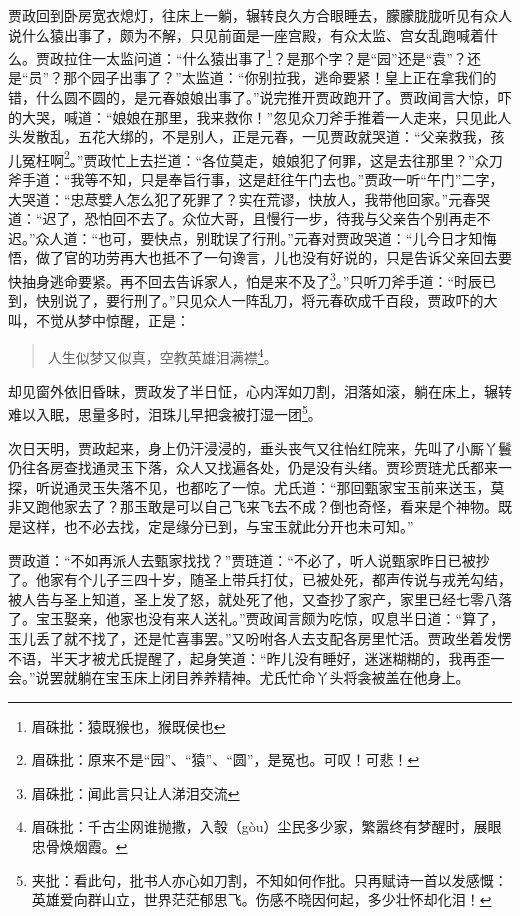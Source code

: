 \documentclass[12pt,oneside]{book}
\newenvironment{shici}{%
\begin{verse}%
\centering\large\hspace{12pt}}%
{\end{verse}}
\begin{document}
贾政回到卧房宽衣熄灯，往床上一躺，辗转良久方合眼睡去，朦朦胧胧听见有众人说什么猿出事了，颇为不解，只见前面是一座宫殿，有众太监、宫女乱跑喊着什么。贾政拉住一太监问道：“什么猿出事了\footnote{眉硃批：猿既猴也，猴既侯也}？是那个字？是“园”还是“袁”？还是“员”？那个园子出事了？”太监道：“你别拉我，逃命要紧！皇上正在拿我们的错，什么圆不圆的，是元春娘娘出事了。”说完推开贾政跑开了。贾政闻言大惊，吓的大哭，喊道：“娘娘在那里，我来救你！”忽见众刀斧手推着一人走来，只见此人头发散乱，五花大绑的，不是别人，正是元春，一见贾政就哭道：“父亲救我，孩儿冤枉啊\footnote{眉硃批：原来不是“园”、“猿”、“圆”，是冤也。可叹！可悲！}。”贾政忙上去拦道：“各位莫走，娘娘犯了何罪，这是去往那里？”众刀斧手道：“我等不知，只是奉旨行事，这是赶往午门去也。”贾政一听“午门”二字，大哭道：“忠荩嬖人怎么犯了死罪了？实在荒谬，快放人，我带他回家。”元春哭道：“迟了，恐怕回不去了。众位大哥，且慢行一步，待我与父亲告个别再走不迟。”众人道：“也可，要快点，别耽误了行刑。”元春对贾政哭道：“儿今日才知悔悟，做了官的功劳再大也抵不了一句谗言，儿也没有好说的，只是告诉父亲回去要快抽身逃命要紧。再不回去告诉家人，怕是来不及了\footnote{眉硃批：闻此言只让人涕泪交流}。”只听刀斧手道：“时辰已到，快别说了，要行刑了。”只见众人一阵乱刀，将元春砍成千百段，贾政吓的大叫，不觉从梦中惊醒，正是：

\begin{shici}
人生似梦又似真，空教英雄泪满襟\footnote{眉硃批：千古尘网谁抛撒，入彀（gòu）尘民多少家，繁嚣终有梦醒时，展眼忠骨焕烟霞。}。
\end{shici}

却见窗外依旧昏昧，贾政发了半日怔，心内浑如刀割，泪落如滚，躺在床上，辗转难以入眠，思量多时，泪珠儿早把衾被打湿一团\footnote{夹批：看此句，批书人亦心如刀割，不知如何作批。只再赋诗一首以发感慨：英雄爱向群山立，世界茫茫郁思飞。伤感不晓因何起，多少壮怀却化泪！}。

次日天明，贾政起来，身上仍汗浸浸的，垂头丧气又往怡红院来，先叫了小厮丫鬟仍往各房查找通灵玉下落，众人又找遍各处，仍是没有头绪。贾珍贾琏尤氏都来一探，听说通灵玉失落不见，也都吃了一惊。尤氏道：“那回甄家宝玉前来送玉，莫非又跑他家去了？那玉敢是可以自己飞来飞去不成？倒也奇怪，看来是个神物。既是这样，也不必去找，定是缘分已到，与宝玉就此分开也未可知。”

贾政道：“不如再派人去甄家找找？”贾琏道：“不必了，听人说甄家昨日已被抄了。他家有个儿子三四十岁，随圣上带兵打仗，已被处死，都声传说与戎羌勾结，被人告与圣上知道，圣上发了怒，就处死了他，又查抄了家产，家里已经七零八落了。宝玉娶亲，他家也没有来人送礼。”贾政闻言颇为吃惊，叹息半日道：“算了，玉儿丢了就不找了，还是忙喜事罢。”又吩咐各人去支配各房里忙活。贾政坐着发愣不语，半天才被尤氏提醒了，起身笑道：“昨儿没有睡好，迷迷糊糊的，我再歪一会。”说罢就躺在宝玉床上闭目养养精神。尤氏忙命丫头将衾被盖在他身上。
\end{document}
